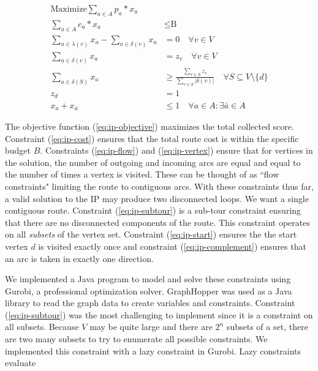 \documentclass[11pt]{article}
\newcommand{\set}[1]{\ensuremath{\{{#1}\}}} %
\newcommand{\sse}{\subseteq} %
\begin{document}
\begin{align}
\text{Maximize} \sum_{a \in A}{p_a * x_a} &\label{eq:ip-objective}\\  
\sum_{a \in A}{c_a * x_a} &\leq \text{B} \label{eq:ip-cost}\\
\sum_{a \in \lambda(v)}{x_a}  -\sum_{a \in \delta(v)}{x_a} &= 0 \quad \forall v \in V\label{eq:ip-flow}\\
\sum_{a \in \delta(v)}{x_a} &= z_v \quad\forall v \in V \label{eq:ip-vertex}\\
\sum_{a \in \delta(S)}{x_a} &\geq \frac{\sum_{v \in S}{z_v}}{\sum_{v \in S}{|\delta(v)|}} \quad \forall S \sse V \setminus \set{d} \label{eq:ip-subtour}\\
z_d &= 1\label{eq:ip-start}\\
x_a + x_{\bar{a}} &\leq 1 \quad \forall a \in A: \exists\bar{a} \in A\label{eq:ip-complement}
\end{align}

The objective function (\ref{eq:ip-objective}) maximizes the total collected score. Constraint (\ref{eq:ip-cost}) ensures that the total route cost is within the specific budget $B$. Constraints (\ref{eq:ip-flow}) and (\ref{eq:ip-vertex}) ensure that for vertices in the solution, the number of outgoing and incoming arcs are equal and equal to the number of times a vertex is visited. These can be thought of as ``flow constraints" limiting the route to contiguous arcs. With these constraints thus far, a valid solution to the IP may produce two disconnected loops. We want a single contiguous route. Constraint (\ref{eq:ip-subtour}) is a sub-tour constraint ensuring that there are no disconnected components of the route. This constraint operates on all \emph{subsets} of the vertex set. Constraint (\ref{eq:ip-start}) ensures the the start vertex $d$ is visited exactly once and constraint (\ref{eq:ip-complement}) ensures that an arc is taken in exactly one direction.
 

We implemented a Java program to model and solve these constraints using Gurobi, a professional optimization solver. GraphHopper was used as a Java library to read the graph data to create variables and constraints. Constraint (\ref{eq:ip-subtour}) was the most challenging to implement since it is a constraint on all subsets. Because $V$ may be quite large and there are $2^n$ subsets of a set, there are two many subsets to try to enumerate all possible constraints. We implemented this constraint with a lazy constraint in Gurobi. Lazy constraints evaluate 
\end{document}
